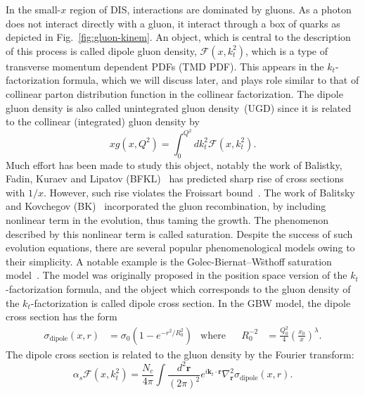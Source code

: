 \documentclass[12pt]{article}
\numberwithin{equation}{section}
\numberwithin{table}{section}
\numberwithin{figure}{section}
\newcommand{\comment}[1]{\texttt{\color{red}#1}}
\begin{document}
In the small-$x$ region of DIS, interactions are dominated by gluons\cite{Kovchegov:2012mbw}. As a photon does not interact directly with a gluon, it interact through a box of quarks as depicted in Fig.~\ref{fig:gluon-kinem}. 
An object, which is central to the description of this process is called dipole gluon density, $\mathcal{F}(x,k_t^2)$, which is a type of transverse momentum dependent PDFs (TMD PDF). This appears in the $k_t$-factorization formula, which we will discuss later, and plays role similar to that of collinear parton distribution function in the collinear factorization.
The dipole gluon density is also called unintegrated gluon density~(UGD) since it is related to the collinear (integrated) gluon density by
\begin{equation}
xg(x,Q^2)=\int^{Q^2}_0 dk_t^2 \mathcal{F}(x,k^2_t).
\end{equation}
Much effort has been made to study this object, notably the work of Balistky, Fadin, Kuraev and Lipatov (BFKL)~\cite{Balitsky:1978ic, Kuraev:1977fs} has predicted sharp rise of cross sections with $1/x$.  However, such rise violates the Froissart bound~\cite{Kovchegov:2012mbw}. The work of Balitsky and Kovchegov (BK)~\cite{Balitsky:1995ub,Kovchegov:1999yj} incorporated the gluon recombination, by including nonlinear term in the evolution, thus taming the growth. The phenomenon described by this nonlinear term is called saturation.
Despite the success of such evolution equations, there are several popular phenomenological models owing to their simplicity. A notable example is the Golec-Biernat--W\"sthoff saturation model~\cite{Golec-Biernat:1998zce}. The model was originally proposed in the position space version of the $k_t$-factorization formula, and the object which corresponds to the gluon density of the $k_t$-factorization is called dipole cross section.
In the GBW model, the dipole cross section has the form~\cite{Golec-Biernat:1998zce}
\begin{align}
\sigma_{\mathrm{dipole}}(x,r)&=\sigma_0\left(1-e^{-r^2/R^2_0}\right)&\mathrm{where}&
&R^{-2}_0&=\frac{Q_0^{2}}{4}\left(\frac{x_0}{x}\right)^\lambda.
\end{align}
The dipole cross section is related to the gluon density by the Fourier transform: 
\begin{equation}
\alpha_s\mathcal{F}(x,k_t^2)=\frac{N_c}{4\pi}\int\frac{d^2\mathbf{r}}{(2\pi)^2}e^{i\mathbf{k}_t\cdot \mathbf{r} }\nabla_{\mathbf{r}}^2\sigma_{\mathrm{dipole}}(x,r).
\label{eq:dipole-gluon}
\end{equation}
\end{document}
